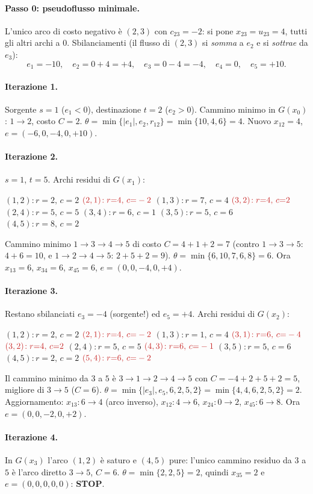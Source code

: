 \documentclass[11pt,a4paper]{article}
\newcommand{\rd}[4]{\mbox{$(#1,#2)\!:r{=}#3,\,c{=}#4$}\hspace{1.1em}}
\newcommand{\ri}[4]{\mbox{$\textcolor{neg}{(#1,#2)\!:r{=}#3,\,c{=}#4}$}\hspace{1.1em}}
\newenvironment{resid}{\par\smallskip\noindent\small\raggedright\ignorespaces}{\par\smallskip\noindent}
\begin{document}
\begin{sol}
\paragraph{Passo 0: pseudoflusso minimale.} L'unico arco di costo negativo è $(2,3)$ con
$c_{23}=-2$: si pone $x_{23}=u_{23}=4$, tutti gli altri archi a $0$. Sbilanciamenti
(il flusso di $(2,3)$ si \emph{somma} a $e_2$ e si \emph{sottrae} da $e_3$):
\[
 e_1=-10,\quad e_2=0+4=+4,\quad e_3=0-4=-4,\quad e_4=0,\quad e_5=+10 .
\]

\paragraph{Iterazione 1.} Sorgente $s=1$ ($e_1<0$), destinazione $t=2$ ($e_2>0$).
Cammino minimo in $G(x_0)$: $1\to2$, costo $C=2$.
$\theta=\min\{|e_1|,e_2,r_{12}\}=\min\{10,4,6\}=4$. Nuovo $x_{12}=4$, $e=(-6,0,-4,0,+10)$.

\paragraph{Iterazione 2.} $s=1$, $t=5$. Archi residui di $G(x_1)$:
\begin{resid}
\rd{1}{2}{2}{2} \ri{2}{1}{4}{-2} \rd{1}{3}{7}{4} \ri{3}{2}{4}{2}
\rd{2}{4}{5}{5} \rd{3}{4}{6}{1} \rd{3}{5}{5}{6} \rd{4}{5}{8}{2}
\end{resid}
Cammino minimo $1\to3\to4\to5$ di costo $C=4+1+2=7$ (contro $1\to3\to5$: $4+6=10$, e
$1\to2\to4\to5$: $2+5+2=9$). $\theta=\min\{6,10,7,6,8\}=6$.
Ora $x_{13}=6$, $x_{34}=6$, $x_{45}=6$, $e=(0,0,-4,0,+4)$.

\paragraph{Iterazione 3.} Restano sbilanciati $e_3=-4$ (sorgente!) ed $e_5=+4$.
Archi residui di $G(x_2)$:
\begin{resid}
\rd{1}{2}{2}{2} \ri{2}{1}{4}{-2} \rd{1}{3}{1}{4} \ri{3}{1}{6}{-4}
\ri{3}{2}{4}{2} \rd{2}{4}{5}{5} \ri{4}{3}{6}{-1} \rd{3}{5}{5}{6}
\rd{4}{5}{2}{2} \ri{5}{4}{6}{-2}
\end{resid}
Il cammino minimo da $3$ a $5$ è $3\to1\to2\to4\to5$ con
$C=-4+2+5+2=5$, migliore di $3\to5$ ($C=6$).
$\theta=\min\{|e_3|,e_5,6,2,5,2\}=\min\{4,4,6,2,5,2\}=2$.
Aggiornamento: $x_{13}:6\to4$ (arco inverso), $x_{12}:4\to6$, $x_{24}:0\to2$, $x_{45}:6\to8$.
Ora $e=(0,0,-2,0,+2)$.

\paragraph{Iterazione 4.} In $G(x_3)$ l'arco $(1,2)$ è saturo e $(4,5)$ pure: l'unico cammino
residuo da $3$ a $5$ è l'arco diretto $3\to5$, $C=6$.
$\theta=\min\{2,2,5\}=2$, quindi $x_{35}=2$ e $e=(0,0,0,0,0)$: \textbf{STOP}.


\end{sol}
\end{document}
